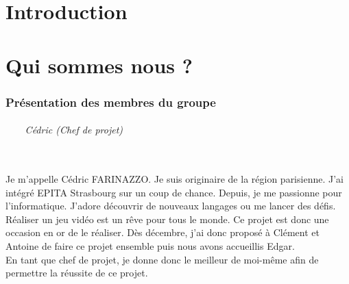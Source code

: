 \documentclass[titlepage, 13px, a4paper]{report}
\begin{document}
\AddToShipoutPicture*{\BackgroundPic}

\maketitle
\tableofcontents


\part{Introduction} 
\paragraph{} \hspace{0pt}




\newpage


\part{Qui sommes nous ?}
\section{Présentation des membres du groupe}

\paragraph{~~~~Cédric (Chef de projet)} \hspace{0pt} \\
Je m’appelle Cédric FARINAZZO. Je suis originaire de la région parisienne. 
J’ai intégré EPITA Strasbourg sur un coup de chance. Depuis, je me passionne pour l’informatique. 
J’adore découvrir de nouveaux langages ou me lancer des défis. \\
Réaliser un jeu vidéo est un rêve pour tous le monde. Ce projet est donc une occasion en or de le réaliser. 
Dès décembre, j’ai donc proposé à Clément et Antoine de faire ce projet ensemble puis nous avons accueillis Edgar. \\
En tant que chef de projet, je donne donc le meilleur de moi-même afin de permettre la réussite de ce projet. \\
\end{document}
